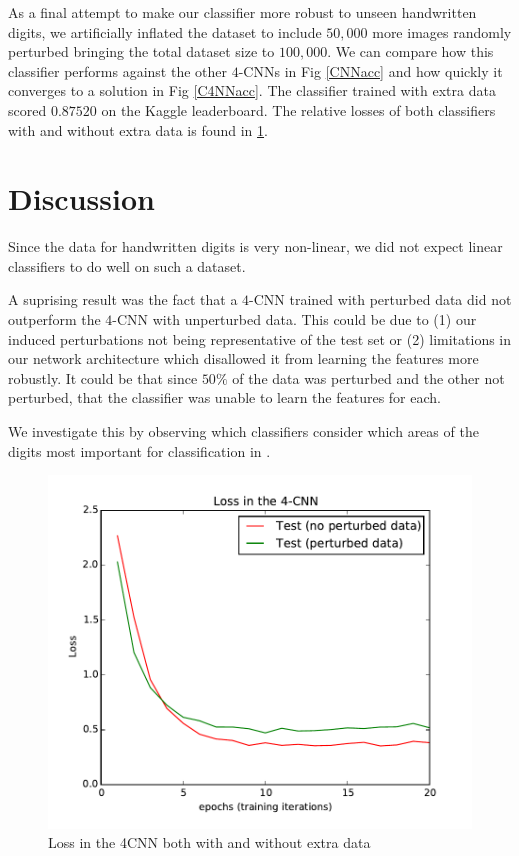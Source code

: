 \documentclass[conference]{IEEEtran}
\begin{document}
As a final attempt to make our classifier more robust to unseen handwritten digits, we artificially inflated the dataset to include $50,000$ more images randomly perturbed bringing the total dataset size to $100,000$. We can compare how this classifier performs against the other $4$-CNNs in Fig \ref{CNNacc} and how quickly it converges to a solution in Fig \ref{C4NNacc}. The classifier trained with extra data scored $0.87520$ on the Kaggle leaderboard. The relative losses of both classifiers with and without extra data is found in \ref{both_C4NNacc}.


\section{Discussion}

Since the data for handwritten digits is very non-linear, we did not expect linear classifiers to do well on such a dataset.

A suprising result was the fact that a $4$-CNN trained with perturbed data did not outperform the $4$-CNN with unperturbed data. This could be due to (1) our induced perturbations not being representative of the test set or (2) limitations in our network architecture which disallowed it from learning the features more robustly. It could be that since $50\%$ of the data was perturbed and the other not perturbed, that the classifier was unable to learn the features for each. 

We investigate this by observing which classifiers consider which areas of the digits most important for classification in .

\begin{figure}[h]
	\label{both_C4NNacc}
	\centering
	\includegraphics[scale=0.6]{4CNN_and_extraloss.pdf}
	\caption{Loss in the 4CNN both with and without extra data}
\end{figure}
\end{document}
